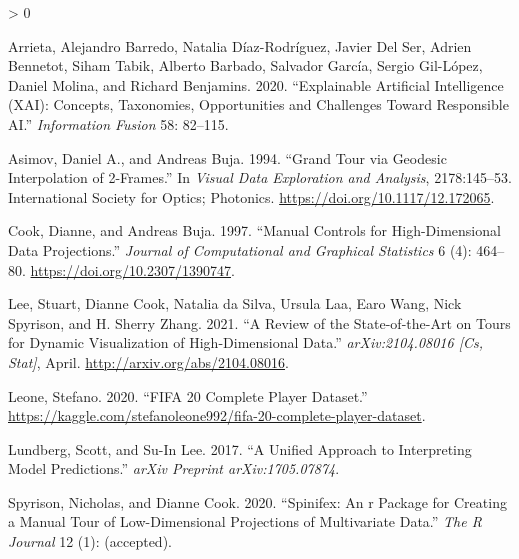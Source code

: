 \documentclass[
]{article}
\newlength{\cslhangindent}
\newenvironment{CSLReferences}[2] %
 {%
  \setlength{\parindent}{0pt}
  \ifodd #1 \everypar{\setlength{\hangindent}{\cslhangindent}}\ignorespaces\fi
  \ifnum #2 > 0
  \setlength{\parskip}{#2\baselineskip}
  \fi
 }%
 {}
\begin{document}
\hypertarget{refs}{}
\begin{CSLReferences}{1}{0}
\leavevmode\hypertarget{ref-arrieta_explainable_2020}{}%
Arrieta, Alejandro Barredo, Natalia Díaz-Rodríguez, Javier Del Ser, Adrien Bennetot, Siham Tabik, Alberto Barbado, Salvador García, Sergio Gil-López, Daniel Molina, and Richard Benjamins. 2020. {``Explainable {Artificial} {Intelligence} ({XAI}): {Concepts}, Taxonomies, Opportunities and Challenges Toward Responsible {AI}.''} \emph{Information Fusion} 58: 82--115.

\leavevmode\hypertarget{ref-asimov_grand_1994}{}%
Asimov, Daniel A., and Andreas Buja. 1994. {``Grand Tour via Geodesic Interpolation of 2-Frames.''} In \emph{Visual Data Exploration and Analysis}, 2178:145--53. International Society for Optics; Photonics. \url{https://doi.org/10.1117/12.172065}.

\leavevmode\hypertarget{ref-cook_manual_1997}{}%
Cook, Dianne, and Andreas Buja. 1997. {``Manual Controls for High-Dimensional Data Projections.''} \emph{Journal of Computational and Graphical Statistics} 6 (4): 464--80. \url{https://doi.org/10.2307/1390747}.

\leavevmode\hypertarget{ref-lee_review_2021}{}%
Lee, Stuart, Dianne Cook, Natalia da Silva, Ursula Laa, Earo Wang, Nick Spyrison, and H. Sherry Zhang. 2021. {``A {Review} of the {State}-of-the-{Art} on {Tours} for {Dynamic} {Visualization} of {High}-{Dimensional} {Data}.''} \emph{arXiv:2104.08016 {[}Cs, Stat{]}}, April. \url{http://arxiv.org/abs/2104.08016}.

\leavevmode\hypertarget{ref-leone_fifa_2020}{}%
Leone, Stefano. 2020. {``{FIFA} 20 Complete Player Dataset.''} \url{https://kaggle.com/stefanoleone992/fifa-20-complete-player-dataset}.

\leavevmode\hypertarget{ref-lundberg_unified_2017}{}%
Lundberg, Scott, and Su-In Lee. 2017. {``A Unified Approach to Interpreting Model Predictions.''} \emph{arXiv Preprint arXiv:1705.07874}.

\leavevmode\hypertarget{ref-spyrison_spinifex_2020}{}%
Spyrison, Nicholas, and Dianne Cook. 2020. {``Spinifex: An r Package for Creating a Manual Tour of Low-Dimensional Projections of Multivariate Data.''} \emph{The R Journal} 12 (1): (accepted).

\end{CSLReferences}
\end{document}
